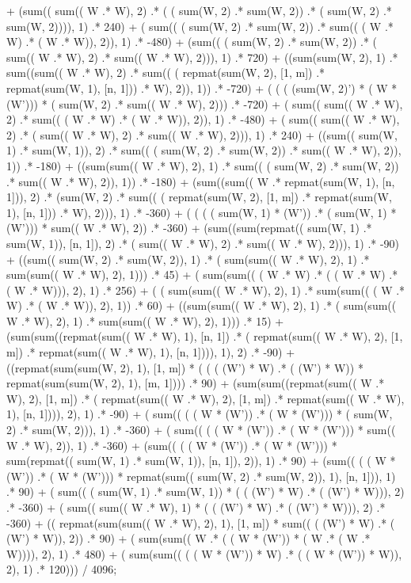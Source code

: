 \documentclass[]{article}
\begin{document}
  + (sum(( sum(( W .* W), 2) .* ( ( sum(W, 2) .* sum(W, 2)) .* ( sum(W, 2) .* sum(W, 2)))), 1)  .* 240) 
  + ( sum(( ( sum(W, 2) .* sum(W, 2)) .* sum(( ( W .* W) .* ( W .* W)), 2)), 1) .* -480) 
  + (sum(( ( sum(W, 2) .* sum(W, 2)) .* ( sum(( W .* W), 2) .* sum(( W .* W), 2))), 1)  .* 720) 
  + ((sum(sum(W, 2), 1)  .* sum((sum(( W .* W), 2)  .* sum(( ( repmat(sum(W, 2), [1, m]) .* repmat(sum(W, 1), [n, 1])) .* W), 2)), 1))  .* -720) 
  + ( ( ( (sum(W, 2)') * ( W * (W'))) * ( sum(W, 2) .* sum(( W .* W), 2))) .* -720) 
  + ( sum(( sum(( W .* W), 2) .* sum(( ( W .* W) .* ( W .* W)), 2)), 1) .* -480) 
  + ( sum(( sum(( W .* W), 2) .* ( sum(( W .* W), 2) .* sum(( W .* W), 2))), 1) .* 240) 
  + ((sum(( sum(W, 1) .* sum(W, 1)), 2)  .* sum(( ( sum(W, 2) .* sum(W, 2)) .* sum(( W .* W), 2)), 1))  .* -180) 
  + ((sum(sum(( W .* W), 2), 1)  .* sum(( ( sum(W, 2) .* sum(W, 2)) .* sum(( W .* W), 2)), 1))  .* -180) 
  + (sum((sum(( W .* repmat(sum(W, 1), [n, 1])), 2)  .* (sum(W, 2)  .* sum(( ( repmat(sum(W, 2), [1, m]) .* repmat(sum(W, 1), [n, 1])) .* W), 2))), 1)  .* -360) 
  + ( ( ( ( sum(W, 1) * (W')) .* ( sum(W, 1) * (W'))) * sum(( W .* W), 2)) .* -360) 
  + (sum((sum(repmat(( sum(W, 1) .* sum(W, 1)), [n, 1]), 2)  .* ( sum(( W .* W), 2) .* sum(( W .* W), 2))), 1)  .* -90) 
  + ((sum(( sum(W, 2) .* sum(W, 2)), 1)  .* ( sum(sum(( W .* W), 2), 1) .* sum(sum(( W .* W), 2), 1)))  .* 45) 
  + ( sum(sum(( ( W .* W) .* ( ( W .* W) .* ( W .* W))), 2), 1) .* 256) 
  + ( ( sum(sum(( W .* W), 2), 1) .* sum(sum(( ( W .* W) .* ( W .* W)), 2), 1)) .* 60) 
  + ((sum(sum(( W .* W), 2), 1)  .* ( sum(sum(( W .* W), 2), 1) .* sum(sum(( W .* W), 2), 1)))  .* 15) 
  + (sum(sum((repmat(sum(( W .* W), 1), [n, 1])  .* ( repmat(sum(( W .* W), 2), [1, m]) .* repmat(sum(( W .* W), 1), [n, 1]))), 1), 2)  .* -90) 
  + ((repmat(sum(sum(W, 2), 1), [1, m])  * ( ( ( (W') * W) .* ( (W') * W)) * repmat(sum(sum(W, 2), 1), [m, 1])))  .* 90) 
  + (sum(sum((repmat(sum(( W .* W), 2), [1, m])  .* ( repmat(sum(( W .* W), 2), [1, m]) .* repmat(sum(( W .* W), 1), [n, 1]))), 2), 1)  .* -90) 
  + ( sum(( ( ( W * (W')) .* ( W * (W'))) * ( sum(W, 2) .* sum(W, 2))), 1) .* -360) 
  + ( sum(( ( ( W * (W')) .* ( W * (W'))) * sum(( W .* W), 2)), 1) .* -360) 
  + (sum(( ( ( W * (W')) .* ( W * (W'))) * sum(repmat(( sum(W, 1) .* sum(W, 1)), [n, 1]), 2)), 1)  .* 90) 
  + (sum(( ( ( W * (W')) .* ( W * (W'))) * repmat(sum(( sum(W, 2) .* sum(W, 2)), 1), [n, 1])), 1)  .* 90) 
  + ( sum(( ( sum(W, 1) .* sum(W, 1)) * ( ( (W') * W) .* ( (W') * W))), 2) .* -360) 
  + ( sum(( sum(( W .* W), 1) * ( ( (W') * W) .* ( (W') * W))), 2) .* -360) 
  + (( repmat(sum(sum(( W .* W), 2), 1), [1, m]) * sum(( ( (W') * W) .* ( (W') * W)), 2))  .* 90) 
  + ( sum(sum(( W .* ( ( W * (W')) * ( W .* ( W .* W)))), 2), 1) .* 480)  + ( sum(sum(( ( ( W * (W')) * W) .* ( ( W * (W')) * W)), 2), 1) .* 120))) / 4096;
\end{document}
